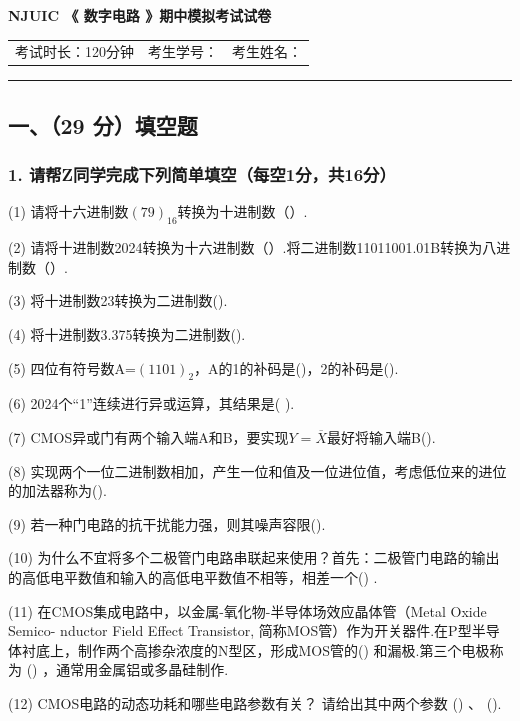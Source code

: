 \documentclass{ctexart}
\begin{document}
\vspace{1em}
\begin{center}

\textbf{\LARGE NJUIC 《 数字电路 》期中模拟考试试卷}
\end{center}

\begin{center}
\begin{tabular}{m{} m{} m{}}
     
     考试时长：120分钟 & 考生学号：&考生姓名：
\end{tabular}
\end{center}
\vspace{-0.3cm}
\hrule height 0.5pt

\subsection*{一、（29 分）填空题}
\subsubsection*{1. 请帮Z同学完成下列简单填空（每空1分，共16分）}
\vspace{-0.2cm}
(1) 请将十六进制数$(79)_{16}$转换为十进制数（\qquad \qquad ）.\par
(2) 请将十进制数2024转换为十六进制数（\qquad \qquad ）.将二进制数11011001.01B转换为八进制数（\qquad \qquad ）.\par
(3) 将十进制数23转换为二进制数(\qquad \qquad  ).\par
(4) 将十进制数3.375转换为二进制数(\qquad \qquad ).\par
(5) 四位有符号数A=$(1101)_2$，A的1的补码是(\qquad \qquad  )，2的补码是(\qquad \qquad  ).\par
(6) 2024个“1”连续进行异或运算，其结果是(  \qquad \qquad    ).\par
(7) CMOS异或门有两个输入端A和B，要实现$Y=\overline{X}$最好将输入端B(\qquad \qquad  ).\par
(8) 实现两个一位二进制数相加，产生一位和值及一位进位值，考虑低位来的进位的加法器称为(\qquad \qquad  ).\par
(9) 若一种门电路的抗干扰能力强，则其噪声容限(\qquad \qquad  ).\par
(10) 为什么不宜将多个二极管门电路串联起来使用？首先：二极管门电路的输出的高低电平数值和输入的高低电平数值不相等，相差一个(\qquad \qquad  ) .\par
(11) 在CMOS集成电路中，以金属-氧化物-半导体场效应晶体管（Metal Oxide Semico- nductor Field Effect Transistor, 简称MOS管）作为开关器件.在P型半导体衬底上，制作两个高掺杂浓度的N型区，形成MOS管的(\qquad \qquad  ) 和漏极.第三个电极称为  (\qquad \qquad  )  ，通常用金属铝或多晶硅制作.\par
(12) CMOS电路的动态功耗和哪些电路参数有关？ 请给出其中两个参数  (\qquad \qquad  )  、 (\qquad \qquad  ).\par
\end{document}
